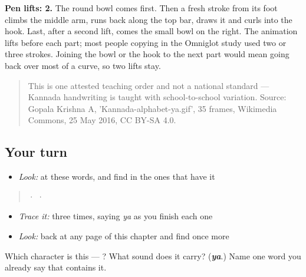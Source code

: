 \textbf{Pen lifts: 2.} The round bowl comes first. Then a fresh stroke from its foot climbs the middle arm, runs back along the top bar, draws it and curls into the hook. Last, after a second lift, comes the small bowl on the right. The animation lifts before each part; most people copying  in the Omniglot study used two or three strokes. Joining the bowl or the hook to the next part would mean going back over most of a curve, so two lifts stay.

\begin{quote}
This is one attested teaching order and not a national standard — Kannada handwriting is taught with school-to-school variation. Source: Gopala Krishna A, 'Kannada-alphabet-ya.gif', 35 frames, Wikimedia Commons, 25 May 2016, CC BY-SA 4.0.
\end{quote}

\subsection*{Your turn}
\begin{itemize}
\raggedright
  \item \emph{Look:} at these words, and find  in the ones that have it
\end{itemize}

\begin{quote}
  ·    ·  
\end{quote}

\begin{itemize}
\raggedright
  \item \emph{Trace it:}  three times, saying \emph{ya} as you finish each one
  \item \emph{Look:} back at any page of this chapter and find  once more
\end{itemize}

\begin{tcolorbox}[breakable,colback=teal!4,colframe=teal!35!black,title={Before you move on}]
Which character is this — ? What sound does it carry? (\emph{\textbf{ya}}.) Name one word you already say that contains it.
\end{tcolorbox}
